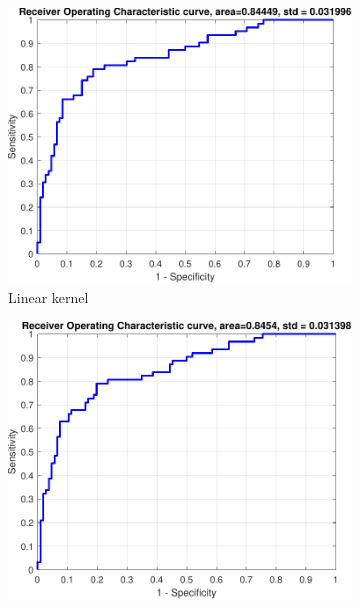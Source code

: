 \documentclass{article}
\begin{document}
        \begin{figure}[H]
             \centering
             
             \begin{subfigure}[b]{0.3\textwidth}
                 \centering
                 \includegraphics[width=\textwidth]{Assignment 1/figures/diabetes_linear_classifier_roc.pdf}
                \caption{Linear kernel}
                 \label{fig:diabetes_liner_roc}
             \end{subfigure}
             \hfill
             \begin{subfigure}[b]{0.3\textwidth}
                 \centering
                 \includegraphics[width=\textwidth]{Assignment 1/figures/diabetes_rbf_classifier_roc.pdf}

\end{subfigure}
\end{figure}
\end{document}
